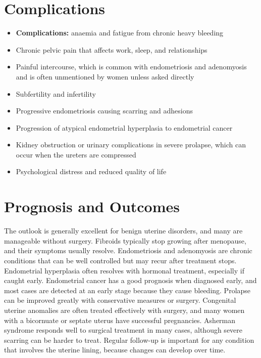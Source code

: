 \section*{Complications}
\begin{itemize}
    \item \textbf{Complications:} anaemia and fatigue from chronic heavy bleeding
    \item Chronic pelvic pain that affects work, sleep, and relationships
    \item Painful intercourse, which is common with endometriosis and adenomyosis and is often unmentioned by women unless asked directly
    \item Subfertility and infertility
    \item Progressive endometriosis causing scarring and adhesions
    \item Progression of atypical endometrial hyperplasia to endometrial cancer
    \item Kidney obstruction or urinary complications in severe prolapse, which can occur when the ureters are compressed
    \item Psychological distress and reduced quality of life
\end{itemize}

\section*{Prognosis and Outcomes}
The outlook is generally excellent for benign uterine disorders, and many are manageable without surgery. Fibroids typically stop growing after menopause, and their symptoms usually resolve. Endometriosis and adenomyosis are chronic conditions that can be well controlled but may recur after treatment stops. Endometrial hyperplasia often resolves with hormonal treatment, especially if caught early. Endometrial cancer has a good prognosis when diagnosed early, and most cases are detected at an early stage because they cause bleeding. Prolapse can be improved greatly with conservative measures or surgery. Congenital uterine anomalies are often treated effectively with surgery, and many women with a bicornuate or septate uterus have successful pregnancies. Asherman syndrome responds well to surgical treatment in many cases, although severe scarring can be harder to treat. Regular follow-up is important for any condition that involves the uterine lining, because changes can develop over time.

